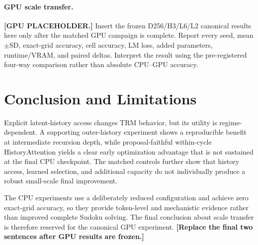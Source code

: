 \paragraph{GPU scale transfer.}
\textbf{[GPU PLACEHOLDER.]}
Insert the frozen D256/H3/L6/L2 canonical results here only after the matched
GPU campaign is complete. Report every seed, mean$\pm$SD, exact-grid accuracy,
cell accuracy, LM loss, added parameters, runtime/VRAM, and paired deltas.
Interpret the result using the pre-registered four-way comparison rather than
absolute CPU--GPU accuracy.

\section{Conclusion and Limitations}
Explicit latent-history access changes TRM behavior, but its utility is
regime-dependent. A supporting outer-history experiment shows a reproducible
benefit at intermediate recursion depth, while proposal-faithful within-cycle
HistoryAttention yields a clear early optimization advantage that is not
sustained at the final CPU checkpoint. The matched controls further show that
history access, learned selection, and additional capacity do not individually
produce a robust small-scale final improvement.

The CPU experiments use a deliberately reduced configuration and achieve zero
exact-grid accuracy, so they provide token-level and mechanistic evidence
rather than improved complete Sudoku solving. The final conclusion about scale
transfer is therefore reserved for the canonical GPU experiment.
\textbf{[Replace the final two sentences after GPU results are frozen.]}
